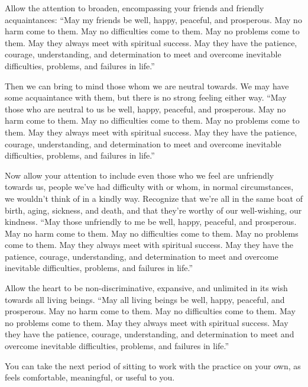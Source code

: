 Allow the attention to broaden, encompassing your friends and friendly
acquaintances: “May my friends be well, happy, peaceful, and prosperous.
May no harm come to them. May no difficulties come to them. May no
problems come to them. May they always meet with spiritual success. May
they have the patience, courage, understanding, and determination to
meet and overcome inevitable difficulties, problems, and failures in
life.”

Then we can bring to mind those whom we are neutral towards. We may have
some acquaintance with them, but there is no strong feeling either way.
“May those who are neutral to us be well, happy, peaceful, and
prosperous. May no harm come to them. May no difficulties come to them.
May no problems come to them. May they always meet with spiritual
success. May they have the patience, courage, understanding, and
determination to meet and overcome inevitable difficulties, problems,
and failures in life.”

Now allow your attention to include even those who we feel are
unfriendly towards us, people we’ve had difficulty with or whom, in
normal circumstances, we wouldn’t think of in a kindly way. Recognize
that we’re all in the same boat of birth, aging, sickness, and death,
and that they’re worthy of our well-wishing, our kindness. “May those
unfriendly to me be well, happy, peaceful, and prosperous. May no harm
come to them. May no difficulties come to them. May no problems come to
them. May they always meet with spiritual success. May they have the
patience, courage, understanding, and determination to meet and overcome
inevitable difficulties, problems, and failures in life.”

Allow the heart to be non-discriminative, expansive, and unlimited in
its wish towards all living beings. “May all living beings be well,
happy, peaceful, and prosperous. May no harm come to them. May no
difficulties come to them. May no problems come to them. May they always
meet with spiritual success. May they have the patience, courage,
understanding, and determination to meet and overcome inevitable
difficulties, problems, and failures in life.”

You can take the next period of sitting to work with the practice on
your own, as feels comfortable, meaningful, or useful to you.

